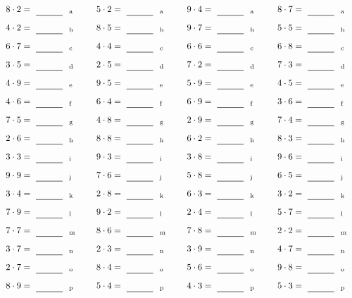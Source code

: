 \documentclass
[
  draft    = true,
  fontsize = 11pt,
  parskip  = half-
]
{scrartcl}
\begin{document}
\par\vfill\par
\begin{align*}
    \pline{8\cdot2}&=\rline{a}
  & \pline{5\cdot2}&=\rline{a}
  & \pline{9\cdot4}&=\rline{a}
  & \pline{8\cdot7}&=\rline{a} \\[1ex]
    \pline{4\cdot2}&=\rline{b}
  & \pline{8\cdot5}&=\rline{b}
  & \pline{9\cdot7}&=\rline{b}
  & \pline{5\cdot5}&=\rline{b} \\[1ex]
    \pline{6\cdot7}&=\rline{c}
  & \pline{4\cdot4}&=\rline{c}
  & \pline{6\cdot6}&=\rline{c}
  & \pline{6\cdot8}&=\rline{c} \\[1ex]
    \pline{3\cdot5}&=\rline{d}
  & \pline{2\cdot5}&=\rline{d}
  & \pline{7\cdot2}&=\rline{d}
  & \pline{7\cdot3}&=\rline{d} \\[1ex]
    \pline{4\cdot9}&=\rline{e}
  & \pline{9\cdot5}&=\rline{e}
  & \pline{5\cdot9}&=\rline{e}
  & \pline{4\cdot5}&=\rline{e} \\[1ex]
    \pline{4\cdot6}&=\rline{f}
  & \pline{6\cdot4}&=\rline{f}
  & \pline{6\cdot9}&=\rline{f}
  & \pline{3\cdot6}&=\rline{f} \\[1ex]
    \pline{7\cdot5}&=\rline{g}
  & \pline{4\cdot8}&=\rline{g}
  & \pline{2\cdot9}&=\rline{g}
  & \pline{7\cdot4}&=\rline{g} \\[1ex]
    \pline{2\cdot6}&=\rline{h}
  & \pline{8\cdot8}&=\rline{h}
  & \pline{6\cdot2}&=\rline{h}
  & \pline{8\cdot3}&=\rline{h} \\[1ex]
    \pline{3\cdot3}&=\rline{i}
  & \pline{9\cdot3}&=\rline{i}
  & \pline{3\cdot8}&=\rline{i}
  & \pline{9\cdot6}&=\rline{i} \\[1ex]
    \pline{9\cdot9}&=\rline{j}
  & \pline{7\cdot6}&=\rline{j}
  & \pline{5\cdot8}&=\rline{j}
  & \pline{6\cdot5}&=\rline{j} \\[1ex]
    \pline{3\cdot4}&=\rline{k}
  & \pline{2\cdot8}&=\rline{k}
  & \pline{6\cdot3}&=\rline{k}
  & \pline{3\cdot2}&=\rline{k} \\[1ex]
    \pline{7\cdot9}&=\rline{l}
  & \pline{9\cdot2}&=\rline{l}
  & \pline{2\cdot4}&=\rline{l}
  & \pline{5\cdot7}&=\rline{l} \\[1ex]
    \pline{7\cdot7}&=\rline{m}
  & \pline{8\cdot6}&=\rline{m}
  & \pline{7\cdot8}&=\rline{m}
  & \pline{2\cdot2}&=\rline{m} \\[1ex]
    \pline{3\cdot7}&=\rline{n}
  & \pline{2\cdot3}&=\rline{n}
  & \pline{3\cdot9}&=\rline{n}
  & \pline{4\cdot7}&=\rline{n} \\[1ex]
    \pline{2\cdot7}&=\rline{o}
  & \pline{8\cdot4}&=\rline{o}
  & \pline{5\cdot6}&=\rline{o}
  & \pline{9\cdot8}&=\rline{o} \\[1ex]
    \pline{8\cdot9}&=\rline{p}
  & \pline{5\cdot4}&=\rline{p}
  & \pline{4\cdot3}&=\rline{p}
  & \pline{5\cdot3}&=\rline{p}
\end{align*}
\end{document}
